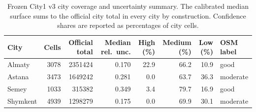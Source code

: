 \begin{table}[H]
\centering
\small
\caption{Frozen City1 v3 city coverage and uncertainty summary. The calibrated median surface sums to the official city total in every city by construction. Confidence shares are reported as percentages of city cells.}
\label{tab:city-coverage}
\begin{tabular}{lrrrrrrl}
\toprule
City & Cells & Official total & Median rel.\ unc. & High (\%) & Medium (\%) & Low (\%) & OSM label \\
\midrule
Almaty   & 3078 & 2351424 & 0.170 & 22.9 & 66.2 & 10.9 & good \\
Astana   & 3473 & 1649242 & 0.281 & 0.0  & 63.7 & 36.3 & moderate \\
Semey    & 1033 & 315382  & 0.349 & 3.4  & 79.7 & 16.9 & good \\
Shymkent & 4939 & 1298279 & 0.175 & 0.0  & 69.9 & 30.1 & moderate \\
\bottomrule
\end{tabular}
\end{table}

